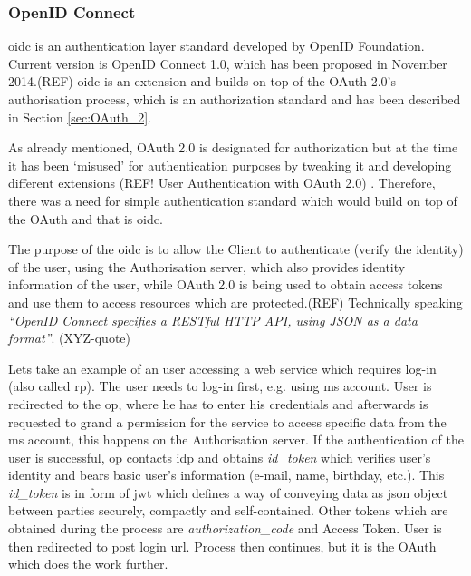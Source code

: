\subsubsection{OpenID Connect}

\acrfull{oidc} is an authentication layer standard developed by OpenID Foundation. Current version is OpenID Connect 1.0, which has been proposed in November 2014.(REF) \acrshort{oidc} is an extension and builds on top of the OAuth 2.0’s authorisation process, which is an authorization standard and has been described in Section \ref{sec:OAuth_2}. 

As already mentioned, OAuth 2.0 is designated for authorization but at the time it has been ‘misused’ for authentication purposes by tweaking it and developing different extensions (REF! User Authentication with OAuth 2.0) . Therefore, there was a need for simple authentication standard which would build on top of the OAuth and that is \acrshort{oidc}.

The purpose of the \acrshort{oidc} is to allow the Client to authenticate (verify the identity) of the user, using the Authorisation server, which also provides identity information of the user, while OAuth 2.0 is being used to obtain access tokens and use them to access resources which are protected.(REF) Technically speaking \textit{“OpenID Connect specifies a RESTful HTTP API, using JSON as a data format”}.  (XYZ-quote)

Lets take an example of an user accessing a web service which requires log-in (also called \acrfull{rp}). The user needs to log-in first, e.g. using \acrfull{ms} account. User is redirected to the \acrfull{op}, where he has to enter his credentials and afterwards is requested to grand a permission for the service to access specific data from the \acrshort{ms} account, this happens on the Authorisation server. If the authentication of the user is successful, \acrshort{op} contacts \acrfull{idp} and obtains \textit{id\_token} which verifies user’s identity and bears basic user’s information (e-mail, name, birthday, etc.). This \textit{id\_token} is in form of \acrfull{jwt} which defines a way of conveying data as \acrshort{json} object between parties securely, compactly and self-contained. Other tokens which are obtained during the process are \textit{authorization\_code} and Access Token. User is then redirected to post login \acrshort{url}. Process then continues, but it is the OAuth which does the work further.

